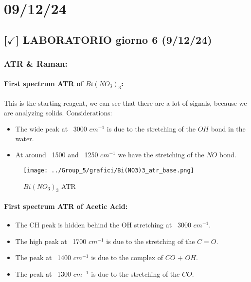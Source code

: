 \section{09/12/24}

\subsection{[$\checkmark$] LABORATORIO giorno 6 (9/12/24)}

\subsubsection{ATR \& Raman: }

\newpage
\paragraph{First spectrum ATR of $Bi(NO_3)_3$:}

This is the starting reagent, we can see that there are a lot of signals, because we are analyzing solids. Considerations:

\begin{itemize}
    \item The wide peak at ~3000 $cm^{-1}$ is due to the stretching of the $OH$ bond in the water.
    \item At around ~1500 and ~1250 $cm^{-1}$ we have the stretching of the $NO$ bond.
\end{itemize}

\begin{figure}[ht]
    \centering
	\texttt{[image: ../Group\_5/grafici/Bi(NO3)3\_atr\_base.png]}
    \caption{$Bi(NO_3)_3$ ATR}
\end{figure}

\newpage
\paragraph{First spectrum ATR of Acetic Acid:}

\begin{itemize}
    \item The CH peak is hidden behind the OH stretching at ~3000 $cm^{-1}$.
    \item The high peak at ~1700 $cm^{-1}$ is due to the stretching of the $C=O$.
    \item The peak at ~1400 $cm^{-1}$ is due to the complex of $CO$ + $OH$.
    \item The peak at ~1300 $cm^{-1}$ is due to the stretching of the $CO$.
\end{itemize}

